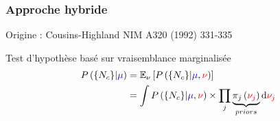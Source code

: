 \begin{frame}
\frametitle{Approche hybride}

\begin{small}

\begin{maliste}
\item Origine : Cousins-Highland NIM A320 (1992) 331-335
\vspace*{0.1cm}
\item Test d'hypothèse basé sur vraisemblance marginalis\'ee
\[
\begin{split}
P\left(\{N_{c}\}|\textcolor{blue}{\mu}\right)&= \mathbb{E}_{\nu}\left[P\left(\{N_{c}\}|\textcolor{blue}{\mu},\textcolor{red}{\nu}\right)\right]\\
&=
\displaystyle\int
P\left(\{N_{c}\}|\textcolor{blue}{\mu},\textcolor{red}{\nu}\right)\times\prod_j\underbrace{\pi_j\left(\textcolor{red}{\nu_j}\right)}_{priors}{\rm d}\textcolor{red}{\nu_j} 
\end{split}
\]



\end{maliste}
\end{small}
\end{frame}
